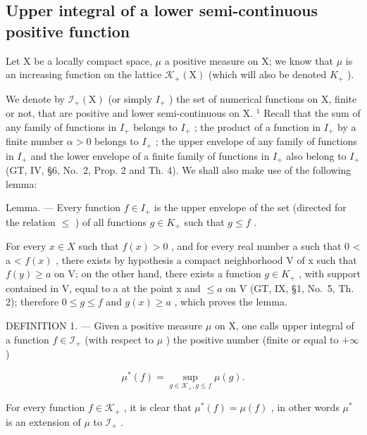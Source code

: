 \subsection{Upper integral of a lower semi-continuous positive function}

Let X be a locally compact space, \(\mu\) a positive measure on X; we know that \(\mu\) is an increasing function on the lattice \(\mathcal{K}_{+}(\mathrm{X})\) (which will also be denoted \(K_{+}\) ).

We denote by \(\mathcal{I}_{+}(\mathrm{X})\) (or simply \(I_{+}\) ) the set of numerical functions on X, finite or not, that are positive and lower semi-continuous on X. \(^{1}\) Recall that the sum of any family of functions in \(I_{+}\) belongs to \(I_{+}\) ; the product of a function in \(I_{+}\) by a finite number \(\alpha > 0\) belongs to \(I_{+}\) ; the upper envelope of any family of functions in \(I_{+}\) and the lower envelope of a finite family of functions in \(I_{+}\) also belong to \(I_{+}\) (GT, IV, §6, No.~2, Prop. 2 and Th. 4). We shall also make use of the following lemma:

Lemma. --- Every function \(f \in I_{+}\) is the upper envelope of the set (directed for the relation \(\leqslant\) ) of all functions \(g \in K_{+}\) such that \(g \leqslant f\) .

For every \(x \in X\) such that \(f(x) > 0\) , and for every real number a such that 0 < a < \(f(x)\) , there exists by hypothesis a compact neighborhood V of x such that \(f(y) \geqslant a\) on V; on the other hand, there exists a function \(g \in K_{+}\) , with support contained in V, equal to a at the point x and \(\leqslant a\) on V (GT, IX, §1, No.~5, Th. 2); therefore \(0 \leqslant g \leqslant f\) and \(g(x) \geqslant a\) , which proves the lemma.

DEFINITION 1. --- Given a positive measure \(\mu\) on X, one calls upper integral of a function \(f \in \mathcal{I}_{+}\) (with respect to \(\mu\) ) the positive number (finite or equal to \(+\infty\) )

\[
\mu^ {*} (f) = \sup _ {g \in \mathcal {K} _ {+}, g \leqslant f} \mu (g).
\]

For every function \(f \in \mathcal{K}_+\) , it is clear that \(\mu^*(f) = \mu(f)\) , in other words \(\mu^*\) is an extension of \(\mu\) to \(\mathcal{I}_+\) .

